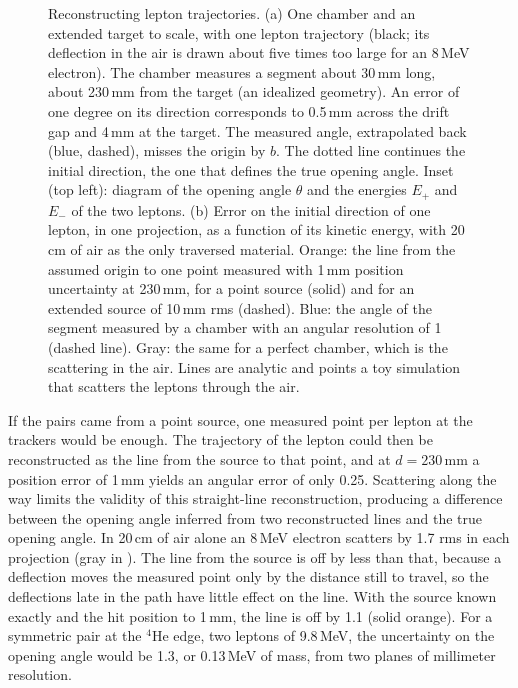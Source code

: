 \begin{figure}[tbp]
  \centering
  \caption{Reconstructing lepton trajectories. (a) One chamber and an extended target to scale, with one lepton trajectory (black; its
  deflection in the air is drawn about five times too large for an 8\,MeV electron). The chamber measures a segment
  about 30\,mm long, about 230\,mm from the target (an idealized geometry). An error of one degree on its direction corresponds to 0.5\,mm
  across the drift gap and 4\,mm at the target. The measured angle, extrapolated back (blue, dashed), misses the
  origin by $b$. The dotted line continues the initial direction, the one that defines the true opening angle. Inset (top left): diagram of the opening angle $\theta$ and the energies $E_+$ and
  $E_-$ of the two leptons. (b) Error on the initial
  direction of one lepton, in one projection, as a function of its kinetic energy, with 20\,cm of air as the only traversed material.
  Orange: the line from the assumed origin to one point measured with 1\,mm position uncertainty at 230\,mm, for a point source (solid) and for an extended source of
  10\,mm rms (dashed). Blue: the angle of the segment measured by a chamber with an angular resolution of 1\textdegree{} (dashed line). Gray: the
  same for a perfect chamber, which is the scattering in the air. Lines are analytic and points a toy simulation that
  scatters the leptons through the air.}
  \label{fig:pointing}
\end{figure}

If the pairs came from a point source, one measured point per lepton at the trackers would be enough. The trajectory of the lepton could then be reconstructed as the line from the source to that point, and at $d=230$\,mm a position error of 1\,mm yields an angular error of only 0.25\textdegree. Scattering along the way limits the validity of this straight-line reconstruction, producing a difference between the opening angle inferred from two reconstructed lines and the true opening angle. In 20\,cm of air alone an 8\,MeV electron scatters by 1.7\textdegree{} rms in each projection
(gray in ). The line from the source is off by less than that, because a deflection moves the measured point only by the distance still to travel, so the deflections late in the path have little effect on the line. With the source known exactly and the hit position to 1\,mm, the line is off by 1.1\textdegree{} (solid orange). For a symmetric pair at the $^4$He edge, two leptons of 9.8\,MeV, the uncertainty on the opening angle would
be 1.3\textdegree, or 0.13\,MeV of mass, from two planes of millimeter resolution.

